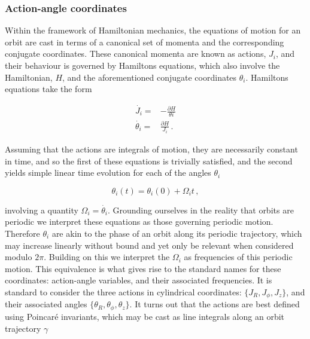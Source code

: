 \subsubsection{Action-angle coordinates}

Within the framework of Hamiltonian mechanics, the equations of motion for an orbit are cast in terms of a canonical set of momenta and the corresponding conjugate coordinates. These canonical momenta are known as actions, $J_{i}$, and their behaviour is governed by Hamiltons equations, which also involve the Hamiltonian, $H$, and the aforementioned conjugate coordinates $\theta_{i}$. Hamiltons equations take the form

\begin{equation}
    \label{ch1:eq:hamiltons-equations}
\begin{split}
    \dot{J_{i}}= & -\frac{\partial H}{\theta{i}} \\
    \dot{\theta_{i}} = & \frac{\partial H}{J_{i}}\,.
\end{split}
\end{equation}

Assuming that the actions are integrals of motion, they are necessarily constant in time, and so the first of these equations is trivially satisfied, and the second yields simple linear time evolution for each of the angles $\theta_{i}$ 

\begin{equation}
    \label{ch1:eq:angle-evolution}
    \theta_{i}(t) = \theta_{i}(0) + \Omega_{i}t\,,
\end{equation}

\noindent involving a quantity $\Omega_{i} = \dot{\theta_{i}}$. Grounding ourselves in the reality that orbits are periodic we interpret these equations as those governing periodic motion. Therefore $\theta_{i}$ are akin to the phase of an orbit along its periodic trajectory, which may increase linearly without bound and yet only be relevant when considered modulo $2\pi$. Building on this we interpret the $\Omega_{i}$ as frequencies of this periodic motion. This equivalence is what gives rise to the standard names for these coordinates: action-angle variables, and their associated frequencies. It is standard to consider the three actions in cylindrical coordinates: $\{J_{R}, J_{\phi}, J_{z}\}$, and their associated angles $\{\theta_{R}, \theta_{\phi}, \theta_{z}\}$. It turns out that the actions are best defined using Poincar\'{e} invariants, which may be cast as line integrals along an orbit trajectory $\gamma$ 

